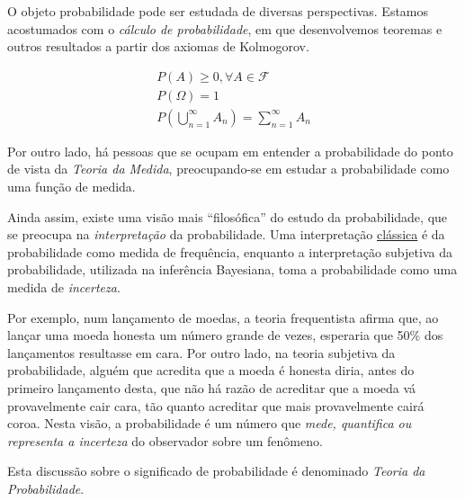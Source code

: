 \documentclass[
  portuguese,
  letterpaper,
  DIV=11,
  numbers=noendperiod]{scrreport}
\theoremstyle{definition}
\theoremstyle{definition}
\theoremstyle{plain}
\theoremstyle{remark}
\begin{document}
\begin{tcolorbox}[enhanced jigsaw, opacityback=0, colframe=quarto-callout-note-color-frame, bottomrule=.15mm, bottomtitle=1mm, breakable, coltitle=black, opacitybacktitle=0.6, left=2mm, colback=white, rightrule=.15mm, titlerule=0mm, toptitle=1mm, title=\textcolor{quarto-callout-note-color}{\faInfo}\hspace{0.5em}{Probabilidade}, arc=.35mm, toprule=.15mm, leftrule=.75mm, colbacktitle=quarto-callout-note-color!10!white]

O objeto probabilidade pode ser estudada de diversas perspectivas.
Estamos acostumados com o \emph{cálculo de probabilidade}, em que
desenvolvemos teoremas e outros resultados a partir dos axiomas de
Kolmogorov.

\[
\begin{aligned}
P(A) \geq 0, \forall A \in \mathcal{F} \\
P(\Omega) = 1 \\
P\left(\bigcup\limits_{n=1}^\infty A_n\right) = \sum^\infty_{n=1} A_n
\end{aligned}
\]

Por outro lado, há pessoas que se ocupam em entender a probabilidade do
ponto de vista da \emph{Teoria da Medida}, preocupando-se em estudar a
probabilidade como uma função de medida.

Ainda assim, existe uma visão mais ``filosófica'' do estudo da
probabilidade, que se preocupa na \emph{interpretação} da probabilidade.
Uma interpretação
\href{https://inferencia-classica.netlify.app}{clássica} é da
probabilidade como medida de frequência, enquanto a interpretação
subjetiva da probabilidade, utilizada na inferência Bayesiana, toma a
probabilidade como uma medida de \emph{incerteza}.

Por exemplo, num lançamento de moedas, a teoria frequentista afirma que,
ao lançar uma moeda honesta um número grande de vezes, esperaria que
50\% dos lançamentos resultasse em cara. Por outro lado, na teoria
subjetiva da probabilidade, alguém que acredita que a moeda é honesta
diria, antes do primeiro lançamento desta, que não há razão de acreditar
que a moeda vá provavelmente cair cara, tão quanto acreditar que mais
provavelmente cairá coroa. Nesta visão, a probabilidade é um número que
\emph{mede, quantifica ou representa a incerteza} do observador sobre um
fenômeno.

Esta discussão sobre o significado de probabilidade é denominado
\emph{Teoria da Probabilidade}.

\end{tcolorbox}
\end{document}
